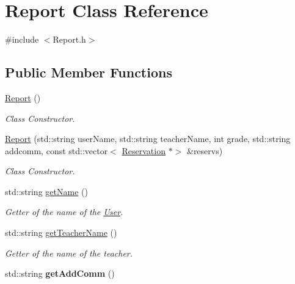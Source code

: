 \hypertarget{class_report}{}\section{Report Class Reference}
\label{class_report}


{\ttfamily \#include $<$Report.\+h$>$}

\subsection*{Public Member Functions}
\begin{DoxyCompactItemize}
\item 
\mbox{\label{class_report_ae3150817fcf4ebf814358baf5bd72e8f}} 
\mbox{\hyperlink{class_report_ae3150817fcf4ebf814358baf5bd72e8f}{Report}} ()
\begin{DoxyCompactList}\small\item\em Class Constructor. \end{DoxyCompactList}\item 
\mbox{\hyperlink{class_report_a0354159ad666bbe9a6166938dcb0b5ca}{Report}} (std\+::string user\+Name, std\+::string teacher\+Name, int grade, std\+::string addcomm, const std\+::vector$<$ \mbox{\hyperlink{class_reservation}{Reservation}} $\ast$$>$ \&reservs)
\begin{DoxyCompactList}\small\item\em Class Constructor. \end{DoxyCompactList}\item 
std\+::string \mbox{\hyperlink{class_report_aaeac48b6c10c5bbf240fc518b6d45d05}{get\+Name}} ()
\begin{DoxyCompactList}\small\item\em Getter of the name of the \mbox{\hyperlink{class_user}{User}}. \end{DoxyCompactList}\item 
std\+::string \mbox{\hyperlink{class_report_af7c52b70f5fe6feae64e44affa6095cd}{get\+Teacher\+Name}} ()
\begin{DoxyCompactList}\small\item\em Getter of the name of the teacher. \end{DoxyCompactList}\item 
\mbox{\label{class_report_aea25a47f972d0048ae7f788218636c65}} 
std\+::string {\bfseries get\+Add\+Comm} ()
\item 
$$
\end{DoxyCompactItemize}
